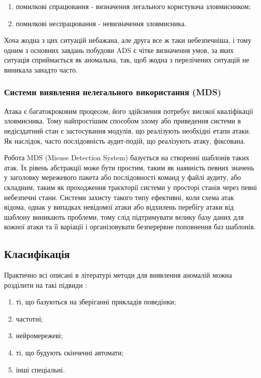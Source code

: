\begin{enumerate}
\item  помилкові спрацювання - визначення легального користувача зловмисником;
\item  помилкові неспрацювання - невизначення зловмисника.
\end{enumerate}

Хоча жодна з цих ситуацій небажана, але друга все ж таки небезпечніша, і тому
одним з основних завдань побудови ADS є чітке визначення умов, за яких ситуація
сприймається як аномальна, так, щоб жодна з перелічених ситуацій не виникала
занадто часто.

\subsubsection{Системи виявлення нелегального використання (MDS)}

Атака є багатокроковим процесом, його здійснення потребує високої кваліфікації
зловмисника. Тому найпростішим способом злому або приведення системи в
недієздатний стан є застосування модулів, що реалізують необхідні етапи
атаки. Як наслідок, часто послідовність аудит-подій, що реалізують атаку,
фіксована.

Робота MDS (Misuse Detection System) базується на створенні шаблонів таких атак.
Їх рівень абстракції може бути простим, таким як наявність певних значень у
заголовку мережевого пакета або послідовності команд у файлі аудиту, або
складним, таким як проходження траєкторії системи у просторі станів через
певні небезпечні стани. Системи захисту такого типу ефективні, коли схема атак
відома, однак у випадках невідомої атаки або відхилень перебігу атаки від
шаблону виникають проблеми, тому слід підтримувати велику базу даних для
кожної атаки та її варіації і організовувати безперервне поповнення баз
шаблонів.

\subsection{Класифікація}

Практично всі описані в літературі методи для виявлення аномалій можна розділити
на такі підвиди \cite{kolodchak2012modern}:

\begin{enumerate}
\item ті, що базуються на зберіганні прикладів поведінки;
\item частотні;
\item нейромережеві;
\item ті, що будують скінченні автомати;
\item інші спеціальні.
\end{enumerate}


